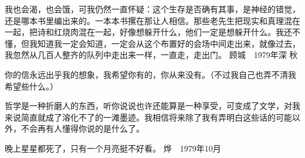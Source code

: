 \documentclass{article}
\begin{document}
我也会渴，也会饿，可我仍然一直怀疑：这个生存是否确有其事，是神经的错觉，还是哪本书里编出来的。一本本书摞在那让人相信。那些老先生把现实和真理混在一起，把诗和红烧肉混在一起，好像想躲开什么，他们一定是想躲开什么。我还不懂，但我知道我一定会知道，一定会从这个布置好的会场中间走出来，就像过去，我忽然从几百人整齐的队列中走出来一样，一直走，走出门。 顾城　1979年深
秋 



你的信永远出乎我的想象，我希望你有的，你从来没有。（不过我自己也弄不清我希望些什么。）
\newpage


哲学是一种折磨人的东西，听你说说也许还能算是一种享受，可变成了文学，对我来说简直就成了溶化不了的一滩墨迹。我相信将来除了我有弄明白这些话的可能以外，不会再有人懂得你说的是什么了。

晚上星星都死了，只有一个月亮挺不好看。 烨　1979年10月
\end{document}
